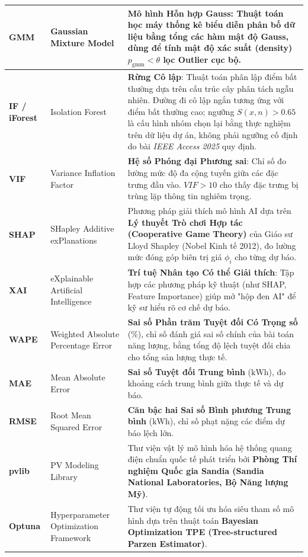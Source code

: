 \documentclass[12pt,a4paper]{article}
\begin{document}
\begin{table}[H]
\begin{tabularx}{\linewidth}{|l|l|X|}
\textbf{GMM} & Gaussian Mixture Model & \textbf{Mô hình Hỗn hợp Gauss}: Thuật toán học máy thống kê biểu diễn phân bố dữ liệu bằng tổng các hàm mật độ Gauss, dùng để tính mật độ xác suất (density) $p_{\text{gmm}} < \theta$ lọc Outlier cục bộ. \\ \hline
\textbf{IF / iForest} & Isolation Forest & \textbf{Rừng Cô lập}: Thuật toán phân lập điểm bất thường dựa trên cấu trúc cây phân tách ngẫu nhiên. Đường đi cô lập ngắn tương ứng với điểm bất thường cao; ngưỡng $S(x,n)>0.65$ là cấu hình nhóm chọn lại bằng thực nghiệm trên dữ liệu dự án, không phải ngưỡng cố định do bài \textit{IEEE Access 2025} quy định. \\ \hline
\textbf{VIF} & Variance Inflation Factor & \textbf{Hệ số Phóng đại Phương sai}: Chỉ số đo lường mức độ đa cộng tuyến giữa các đặc trưng đầu vào. $VIF > 10$ cho thấy đặc trưng bị trùng lặp thông tin nghiêm trọng. \\ \hline
\textbf{SHAP} & SHapley Additive exPlanations & Phương pháp giải thích mô hình AI dựa trên \textbf{Lý thuyết Trò chơi Hợp tác (Cooperative Game Theory)} của Giáo sư Lloyd Shapley (Nobel Kinh tế 2012), đo lường mức đóng góp biên trị giá $\phi_i$ cho từng dự báo. \\ \hline
\textbf{XAI} & eXplainable Artificial Intelligence & \textbf{Trí tuệ Nhân tạo Có thể Giải thích}: Tập hợp các phương pháp kỹ thuật (như SHAP, Feature Importance) giúp mở "hộp đen AI" để kỹ sư hiểu rõ cơ chế dự báo. \\ \hline
\textbf{WAPE} & Weighted Absolute Percentage Error & \textbf{Sai số Phần trăm Tuyệt đối Có Trọng số} (\%), chỉ số đánh giá sai số chính của bài toán năng lượng, bằng tổng độ lệch tuyệt đối chia cho tổng sản lượng thực tế. \\ \hline
\textbf{MAE} & Mean Absolute Error & \textbf{Sai số Tuyệt đối Trung bình} ($\text{kWh}$), đo khoảng cách trung bình giữa thực tế và dự báo. \\ \hline
\textbf{RMSE} & Root Mean Squared Error & \textbf{Căn bậc hai Sai số Bình phương Trung bình} ($\text{kWh}$), chỉ số phạt nặng các điểm dự báo lệch lớn. \\ \hline
\textbf{pvlib} & PV Modeling Library & Thư viện vật lý mô hình hóa hệ thống quang điện chuẩn quốc tế phát triển bởi \textbf{Phòng Thí nghiệm Quốc gia Sandia (Sandia National Laboratories, Bộ Năng lượng Mỹ)}. \\ \hline
\textbf{Optuna} & Hyperparameter Optimization Framework & Thư viện tự động tối ưu hóa siêu tham số mô hình dựa trên thuật toán \textbf{Bayesian Optimization TPE (Tree-structured Parzen Estimator)}. \\ \hline
\end{tabularx}
\end{table}
\end{document}
